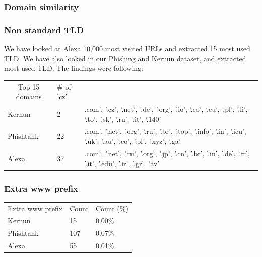 \documentclass[
  digital, %
  oneside, %
  table,   %
  nolof,     %
  nolot,     %
]{fithesis3}
\begin{document}
\subsubsection{Domain similarity}

\subsubsection{Non standard TLD}

We have looked at Alexa 10,000 most visited URLs and extracted 15 most used TLD. We have also looked in our Phishing and Kernun dataset, and extracted most used TLD. The findings were following:

\begin{table}[]
\begin{tabular}{lll}
\multicolumn{1}{c}{Top 15 domains} & \# of 'cz' &                                                                                                                \\
Kernun                             & 2          & .com', '.cz', '.net', '.de', '.org', '.io', '.co', '.eu', '.pl', '.li', '.to', '.sk', '.ru', '.it', '.140'     \\
Phishtank                          & 22         & .com', '.net', '.org', '.ru', '.br', '.top', '.info', '.in', '.icu', '.uk', '.au', '.co', '.pl', '.xyz', '.ga' \\
Alexa                              & 37         & .com', '.net', '.ru', '.org', '.jp', '.cn', '.br', '.in', '.de', '.fr', '.it', '.edu', '.ir', '.gr', '.tv'    
\end{tabular}
\end{table}

\subsubsection{Extra www prefix}

\begin{table}[]
\begin{tabular}{lll}
\multicolumn{1}{c}{Extra www prefix} & Count & Count (\%) \\
Kernun                               & 15    & 0.00\%     \\
Phishtank                            & 107   & 0.07\%     \\
Alexa                                & 55    & 0.01\%    
\end{tabular}
\end{table}
\end{document}

